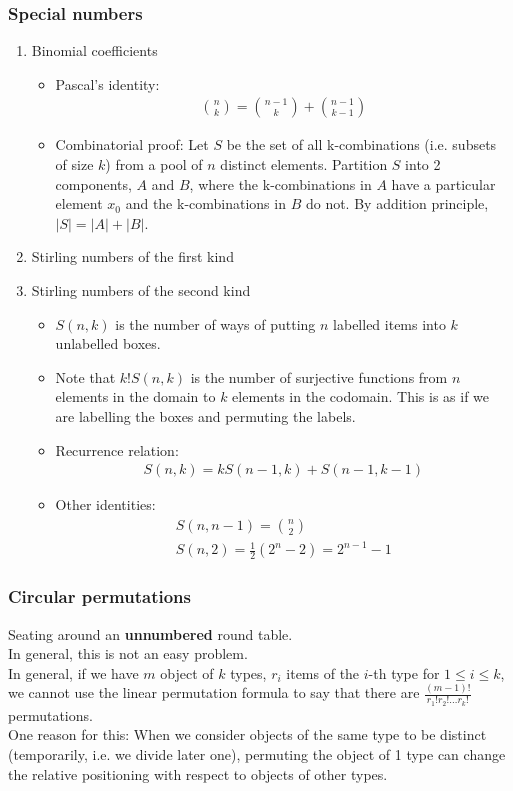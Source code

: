 \documentclass{article}
\begin{document}
\subsubsection{Special numbers}
\begin{enumerate}
	\item Binomial coefficients
	\begin{itemize}
		\item Pascal's identity:
		\begin{align*}
			\binom{n}{k}=\binom{n-1}{k}+\binom{n-1}{k-1}
		\end{align*}
		\item Combinatorial proof: Let $S$ be the set of all k-combinations (i.e. subsets of size $k$) from a pool of $n$ distinct elements. Partition $S$ into 2 components, $A$ and $B$, where the k-combinations in $A$ have a particular element $x_0$ and the k-combinations in $B$ do not. By addition principle, $|S|=|A|+|B|$.
	\end{itemize}
	\item Stirling numbers of the first kind
	
	\item Stirling numbers of the second kind
	\begin{itemize}
		\item $S(n, k)$ is the number of ways of putting $n$ labelled items into $k$ unlabelled boxes. 
		\item Note that $k!S(n,k)$ is the number of surjective functions from $n$ elements in the domain to $k$ elements in the codomain. This is as if we are labelling the boxes and permuting the labels.
		\item Recurrence relation:
		\begin{align*}
			S(n, k) = kS(n-1, k) + S(n-1, k-1)
		\end{align*}
		\item Other identities:
		\begin{align*}
			S(n, n-1) = \binom{n}{2}\\
			S(n, 2) = \frac{1}{2}(2^n-2)=2^{n-1}-1
		\end{align*}
	\end{itemize}		
\end{enumerate}

\subsubsection{Circular permutations}
Seating around an \textbf{unnumbered} round table.\\
In general, this is not an easy problem.\\
In general, if we have $m$ object of $k$ types, $r_i$ items of the $i$-th type for $1\leq i\leq k$, we cannot use the linear permutation formula to say that there are $\frac{(m-1)!}{r_1!r_2!\dots r_k!}$ permutations.\\
One reason for this: When we consider objects of the same type to be distinct (temporarily, i.e. we divide later one), permuting the object of 1 type can change the relative positioning with respect to objects of other types.
\end{document}
